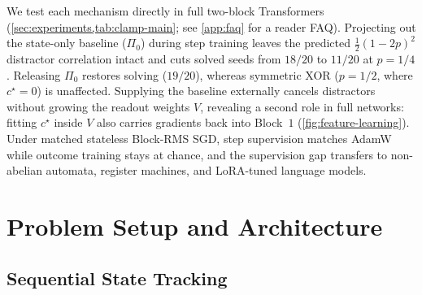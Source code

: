 We test each mechanism directly in full two-block Transformers (\cref{sec:experiments,tab:clamp-main}; see \cref{app:faq} for a reader FAQ). Projecting out the state-only baseline ($\Pi_0$) during step training leaves the predicted $\frac{1}{2}(1-2p)^2$ distractor correlation intact and cuts solved seeds from $18/20$ to $11/20$ at $p = 1/4$. Releasing $\Pi_0$ restores solving ($19/20$), whereas symmetric XOR ($p = 1/2$, where $c^\star = 0$) is unaffected. Supplying the baseline externally cancels distractors without growing the readout weights $V$, revealing a second role in full networks: fitting $c^\star$ inside $V$ also carries gradients back into Block~$1$ (\cref{fig:feature-learning}). Under matched stateless Block-RMS SGD, step supervision matches AdamW while outcome training stays at chance, and the supervision gap transfers to non-abelian automata, register machines, and LoRA-tuned language models.

\section{Problem Setup and Architecture}
\label{sec:setup}
\label{sec:setting}
\label{sec:notation}

\subsection{Sequential State Tracking}
\label{sec:data}
\label{ass:task}
\label{def:lambda}
\label{def:losses}

